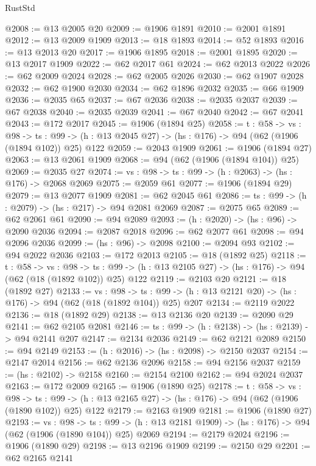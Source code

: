\begin{lexlean}{RustStd}
\begin{coremodule}
{\begin{coremodule}
{{{{{{{{{{{@2008 := @13 @2005 @20
@2009 := @1906 @1891
@2010 := @2001 @1891
@2012 := @13 @2009 @1909
@2013 := @18 @1893
@2014 := @52 @1893
@2016 := @13 @2013 @20
@2017 := @1906 @1895
@2018 := @2001 @1895
@2020 := @13 @2017 @1909
@2022 := @62 @2017 @61
@2024 := @62 @2013 @2022
@2026 := @62 @2009 @2024
@2028 := @62 @2005 @2026
@2030 := @62 @1907 @2028
@2032 := @62 @1900 @2030
@2034 := @62 @1896 @2032
@2035 := @66 @1909
@2036 := @2035 @65
@2037 := @67 @2036
@2038 := @2035 @2037
@2039 := @67 @2038
@2040 := @2035 @2039
@2041 := @67 @2040
@2042 := @67 @2041
@2043 := @172 @2017
@2045 := @1906 (@1894 @25)
@2058 := {t : @58} ->
  {vs : @98} ->
  {ts : @99} -> (h : @13 @2045 @27) -> (hs : @176) -> @94 (@62 (@1906 (@1894 @102)) @25) @122
@2059 := @2043 @1909
@2061 := @1906 (@1894 @27)
@2063 := @13 @2061 @1909
@2068 := @94 (@62 (@1906 (@1894 @104)) @25)
@2069 := @2035 @27
@2074 := {vs : @98} -> {ts : @99} -> (h : @2063) -> (hs : @176) -> @2068 @2069
@2075 := @2059 @61
@2077 := @1906 (@1894 @29)
@2079 := @13 @2077 @1909
@2081 := @62 @2045 @61
@2086 := {ts : @99} -> (h : @2079) -> (hs : @217) -> @94 @2081 @2069
@2087 := @2075 @65
@2089 := @62 @2061 @61
@2090 := @94 @2089
@2093 := (h : @2020) -> (hs : @96) -> @2090 @2036
@2094 := @2087 @2018
@2096 := @62 @2077 @61
@2098 := @94 @2096 @2036
@2099 := (hs : @96) -> @2098
@2100 := @2094 @93
@2102 := @94 @2022 @2036
@2103 := @172 @2013
@2105 := @18 (@1892 @25)
@2118 := {t : @58} ->
  {vs : @98} ->
  {ts : @99} -> (h : @13 @2105 @27) -> (hs : @176) -> @94 (@62 (@18 (@1892 @102)) @25) @122
@2119 := @2103 @20
@2121 := @18 (@1892 @27)
@2133 := {vs : @98} ->
  {ts : @99} -> (h : @13 @2121 @20) -> (hs : @176) -> @94 (@62 (@18 (@1892 @104)) @25) @207
@2134 := @2119 @2022
@2136 := @18 (@1892 @29)
@2138 := @13 @2136 @20
@2139 := @2090 @29
@2141 := @62 @2105 @2081
@2146 := {ts : @99} -> (h : @2138) -> (hs : @2139) -> @94 @2141 @207
@2147 := @2134 @2036
@2149 := @62 @2121 @2089
@2150 := @94 @2149
@2153 := (h : @2016) -> (hs : @2098) -> @2150 @2037
@2154 := @2147 @2014
@2156 := @62 @2136 @2096
@2158 := @94 @2156 @2037
@2159 := (hs : @2102) -> @2158
@2160 := @2154 @2100
@2162 := @94 @2024 @2037
@2163 := @172 @2009
@2165 := @1906 (@1890 @25)
@2178 := {t : @58} ->
  {vs : @98} ->
  {ts : @99} -> (h : @13 @2165 @27) -> (hs : @176) -> @94 (@62 (@1906 (@1890 @102)) @25) @122
@2179 := @2163 @1909
@2181 := @1906 (@1890 @27)
@2193 := {vs : @98} ->
  {ts : @99} -> (h : @13 @2181 @1909) -> (hs : @176) -> @94 (@62 (@1906 (@1890 @104)) @25) @2069
@2194 := @2179 @2024
@2196 := @1906 (@1890 @29)
@2198 := @13 @2196 @1909
@2199 := @2150 @29
@2201 := @62 @2165 @2141
}}}}}}}}}}}
\end{coremodule}}
\end{coremodule}
\end{lexlean}
